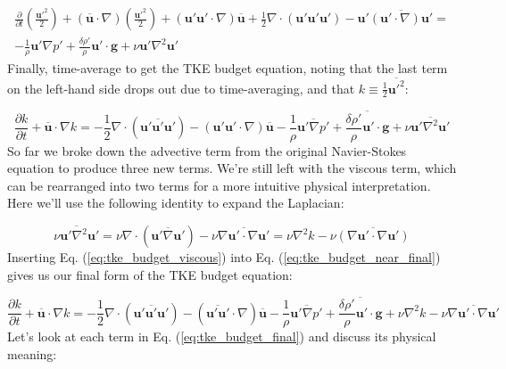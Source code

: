 \documentclass[12pt]{article}
\numberwithin{equation}{section}
\numberwithin{figure}{section}
\numberwithin{table}{section}
\begin{document}
\begin{equation}
  \begin{split}
  \frac{\partial}{\partial t} \left( \frac{\mathbf{u}'^2}{2} \right) +
  (\overline{\mathbf{u}} \cdot \nabla) \left( \frac{\mathbf{u}'^2}{2} \right) +
  (\mathbf{u}' \mathbf{u}' \cdot \nabla) \overline{\mathbf{u}} +
  \frac{1}{2} \nabla \cdot (\mathbf{u}' \mathbf{u}' \mathbf{u}') -
  \mathbf{u}' \overline{(\mathbf{u}' \cdot \nabla) \mathbf{u}'} = \\
  - \frac{1}{\rho} \mathbf{u}' \nabla p'
  + \frac{\delta \rho'}{\rho} \mathbf{u}' \cdot \mathbf{g}
  + \nu \mathbf{u}' \nabla^2 \mathbf{u}'
  \end{split}
\end{equation}
Finally, time-average to get the TKE budget equation, noting that the last term
on the left-hand side drops out due to time-averaging, and that
$k \equiv \frac{1}{2} \overline{\mathbf{u}'^2}$:

\begin{equation}
  \frac{\partial k}{\partial t} + \overline{\mathbf{u}} \cdot \nabla k =
  - \frac{1}{2} \nabla \cdot (\overline{\mathbf{u}' \mathbf{u}' \mathbf{u}'})
  - (\mathbf{u}' \mathbf{u}' \cdot \nabla) \overline{\mathbf{u}}
  - \frac{1}{\rho} \overline{\mathbf{u}' \nabla p'}
  + \overline{\frac{\delta \rho'}{\rho} \mathbf{u}' \cdot \mathbf{g}}
  + \nu \overline{\mathbf{u}' \nabla^2 \mathbf{u}'}
  \label{eq:tke_budget_near_final}
\end{equation}
So far we broke down the advective term from the original Navier-Stokes equation
to produce three new terms.
We're still left with the viscous term, which can be rearranged into two terms
for a more intuitive physical interpretation.
Here we'll use the following identity to expand the Laplacian:

\begin{equation}
  \overline{\nu \mathbf{u}' \nabla^2 \mathbf{u}'} =
  \nu \nabla \cdot (\overline{\mathbf{u}' \nabla \mathbf{u}'}) -
  \nu \overline{\nabla \mathbf{u}' \cdot \nabla \mathbf{u}'} =
  \nu \nabla^2 k - \nu \overline{(\nabla \mathbf{u}' \cdot \nabla \mathbf{u}')}
  \label{eq:tke_budget_viscous}
\end{equation}
Inserting Eq. (\ref{eq:tke_budget_viscous}) into Eq. (\ref{eq:tke_budget_near_final})
gives us our final form of the TKE budget equation:

\begin{equation}
  \frac{\partial k}{\partial t} + \overline{\mathbf{u}} \cdot \nabla k =
  - \frac{1}{2} \nabla \cdot (\overline{\mathbf{u}' \mathbf{u}' \mathbf{u}'})
  - (\overline{\mathbf{u}' \mathbf{u}'} \cdot \nabla) \overline{\mathbf{u}}
  - \frac{1}{\rho} \overline{\mathbf{u}' \nabla p'}
  + \overline{\frac{\delta \rho'}{\rho} \mathbf{u}' \cdot \mathbf{g}}
  + \nu \nabla^2 k
  - \nu \overline{\nabla \mathbf{u}' \cdot \nabla \mathbf{u}'}
  \label{eq:tke_budget_final}
\end{equation}
Let's look at each term in Eq. (\ref{eq:tke_budget_final}) and discuss its
physical meaning:
\end{document}
